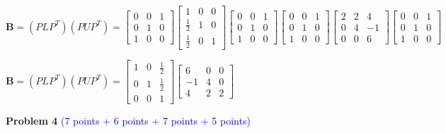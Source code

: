 \documentclass[english,onecolumn]{IEEEtran}
\begin{document}
\begin{enumerate}
    
       	$
    \mathbf{B} = 
    \left(P L P^{T}\right)\left(P U P^{T}\right)
    =
    \begin{bmatrix}
    	0& 0&1 \\
    	0&1&0\\
    	1& 0 &0
    \end{bmatrix}
    \begin{bmatrix}
    	1& 0&0 \\
    	\frac{1}{2}&1&0\\
    	\frac{1}{2}& 0 &1
    \end{bmatrix}
    \begin{bmatrix}
    	0& 0&1 \\
    	0&1&0\\
    	1& 0 &0
    \end{bmatrix}
    \begin{bmatrix}
    	0& 0&1 \\
    	0&1&0\\
    	1& 0 &0
    \end{bmatrix}
    \begin{bmatrix}
    	2& 2&4 \\
    	0&4&-1\\
    	0&0&6
    \end{bmatrix}
    \begin{bmatrix}
    	0& 0&1 \\
    	0&1&0\\
    	1& 0 &0
    \end{bmatrix}
    $ 
    
    $
    \mathbf{B} = 
    \left(P L P^{T}\right)\left(P U P^{T}\right)
    =
    \begin{bmatrix}
    	1& 0&\frac{1}{2} \\
    	0&1&\frac{1}{2}\\
    	0&0&1
    \end{bmatrix}
    \begin{bmatrix}
    	6& 0&0 \\
    	-1&4&0\\
    	4&2&2
    \end{bmatrix}
    $ 
    
\end{enumerate}

\newpage
\noindent\textbf{Problem 4} \textcolor{blue}{(7 points + 6 points + 7 points + 5 points)}
\end{document}
